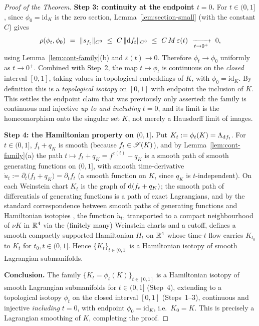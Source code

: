 \begin{proof}[Proof of the Theorem]
\medskip
\noindent\textbf{Step 3: continuity at the endpoint $t=0$.}
For $t\in(0,1]$, since $\phi_0=\mathrm{id}_K$ is the zero section,
Lemma~\ref{lem:section-small} (with the constant $C$) gives
\[
\rho(\phi_t,\phi_0)\ =\ \|s_{f_t}\|_{C^0}\ \le\ C\,\|\qeightdd f_t\|_{C^0}
\ \le\ C\,M\,\varepsilon(t)\ \xrightarrow[t\to0^+]{}\ 0 ,
\]
using Lemma~\ref{lem:cont-family}(b) and $\varepsilon(t)\to0$. Therefore
$\phi_t\to\phi_0$ uniformly as $t\to0^+$. Combined with Step~2, the map
$t\mapsto\phi_t$ is continuous on the \emph{closed} interval $[0,1]$, taking
values in topological embeddings of $K$, with $\phi_0=\mathrm{id}_K$. By
definition this is a \emph{topological isotopy} on $[0,1]$ with endpoint the
inclusion of $K$. This settles the endpoint claim that was previously only
asserted: the family is continuous and injective \emph{up to and including}
$t=0$, and its limit is the homeomorphism onto the singular set $K$, not merely a
Hausdorff limit of images.

\medskip
\noindent\textbf{Step 4: the Hamiltonian property on $(0,1]$.}
Put $K_t:=\phi_t(K)=\Lambda_{\mathrm d f_t}$. For $t\in(0,1]$, $f_t+q_K$ is smooth
(because $f_t\in\mathscr S(K)$), and by Lemma~\ref{lem:cont-family}(a) the path
$t\mapsto f_t+q_K=f^{\varepsilon(t)}+q_K$ is a smooth path of smooth generating
functions on $(0,1]$, with smooth time-derivative
$\dot u_t:=\partial_t\bigl(f_t+q_K\bigr)=\partial_t f_t$ (a smooth function on
$K$, since $q_K$ is $t$-independent). On each Weinstein chart $K_t$ is the graph
of $\mathrm d(f_t+q_K)$; the smooth path of differentials of generating functions is a
path of exact Lagrangians, and by the standard correspondence between smooth paths
of generating functions and Hamiltonian isotopies
\cite[Ch.~9]{McDuffSalamon}, the function $\dot u_t$, transported to a compact
neighbourhood of $\nu K$ in $\mathbb{R}^4$ via the (finitely many) Weinstein charts and a
cutoff, defines a smooth compactly supported Hamiltonian $H_t$ on $\mathbb{R}^4$ whose
time-$t$ flow carries $K_{t_0}$ to $K_t$ for $t_0,t\in(0,1]$. Hence
$\{K_t\}_{t\in(0,1]}$ is a Hamiltonian isotopy of smooth Lagrangian submanifolds.

\medskip
\noindent\textbf{Conclusion.} The family $\{K_t=\phi_t(K)\}_{t\in[0,1]}$ is a
Hamiltonian isotopy of smooth Lagrangian submanifolds for $t\in(0,1]$ (Step~4),
extending to a topological isotopy $\phi_t$ on the closed interval $[0,1]$
(Steps~1–3), continuous and injective \emph{including} $t=0$, with endpoint
$\phi_0=\mathrm{id}_K$, i.e.\ $K_0=K$. This is precisely a Lagrangian smoothing of
$K$, completing the proof.
\end{proof}

